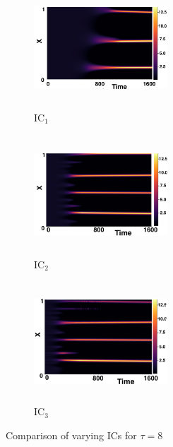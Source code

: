 \begin{figure}[H]
    \centering
    \begin{subfigure}[b]{0.32\textwidth}
        \centering
        \includegraphics[width=5cm,height=4.5cm]{gaff8.png}
        \caption{$\text{IC}_1$}
        \label{}
    \end{subfigure}
    \hfill
    \begin{subfigure}[b]{0.32\textwidth}
        \centering
        \includegraphics[width=5cm,height=4.5cm]{ic28.png}
        \caption{$\text{IC}_2$}
        \label{}
    \end{subfigure}
    \hfill
    \begin{subfigure}[b]{0.32\textwidth}
        \centering
        \includegraphics[width=5cm,height=4.5cm]{ic38.png}
        \caption{$\text{IC}_3$}
        \label{}
    \end{subfigure}
    \caption{Comparison of varying ICs for $\tau=8$}
    \label{fig:figtau8}
\end{figure}

